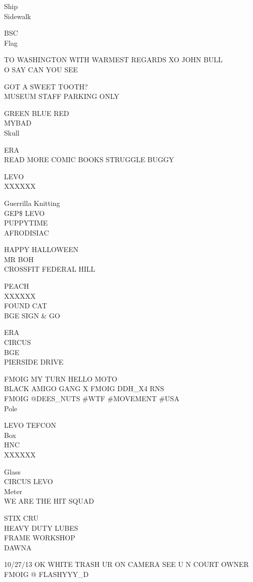 \documentclass[10pt,letterpaper]{article}
\begin{document}
Ship\\
Sidewalk

BSC\\
Flag

TO WASHINGTON WITH WARMEST REGARDS XO JOHN BULL\\
O SAY CAN YOU SEE

GOT A SWEET TOOTH?\\
MUSEUM STAFF PARKING ONLY

GREEN BLUE RED\\
MYBAD\\
Skull

ERA\\
READ MORE COMIC BOOKS STRUGGLE BUGGY

LEVO\\
XXXXXX

Guerrilla Knitting\\
GEP\$ LEVO\\
PUPPYTIME\\
AFRODISIAC

HAPPY HALLOWEEN\\
MR BOH\\
CROSSFIT FEDERAL HILL

PEACH\\
XXXXXX\\
FOUND CAT\\
BGE SIGN \& GO

ERA\\
CIRCUS\\
BGE\\
PIERSIDE DRIVE

FMOIG MY TURN HELLO MOTO\\
BLACK AMIGO GANG X FMOIG DDH\_X4 RNS\\
FMOIG @DEES\_NUTS \#WTF \#MOVEMENT \#USA\\
Pole

LEVO TEFCON\\
Box\\
HNC\\
XXXXXX

Glass\\
CIRCUS LEVO\\
Meter\\
WE ARE THE HIT SQUAD

STIX CRU\\
HEAVY DUTY LUBES\\
FRAME WORKSHOP\\
DAWNA

10/27/13 OK WHITE TRASH UR ON CAMERA SEE U N COURT OWNER\\
FMOIG @ FLASHYYY\_D
\end{document}

